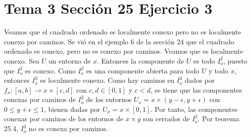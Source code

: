 \documentclass{article}
\begin{document}
\section{Tema 3 Sección 25 Ejercicio 3}

Veamos que el cuadrado ordenado es localmente conexo pero no es localmente conexo por caminos. Se vió en el ejemplo 6 de la sección 24 que el cuadrado ordenado es conexo, pero no es conexo por caminos. Veamos que es localmente conexo. Sea $U$ un entorno de $x$. Entonces la componente de $U$ es todo $I^2_o$, puesto que $I^2_o$ es conexo. Como $I^2_o$ es una componente abierta para todo $U$ y todo $x$, entonces $I^2_o$ es localmente conexo. Como hay caminos en $I^2_o$ dados por $f_x:[a,b]\rightarrow x\times[c,d]$ con $c,d\in [0,1]$ y $c<d$, se tiene que las componentes conexas por caminos de $I^2_o$ de los entornos $U_x=x\times (y-\epsilon, y +\epsilon)$ con $0\leq y +\epsilon\leq 1$, bienen dadas por $U_x=x\times [0,1]$. Por tanto, las componentes conexas por caminos de los entornos de $x\times y$ son cerrados de $I^2_o$. Por teorema 25.4, $I^2_o$ no es conexa por caminos.
\end{document}
